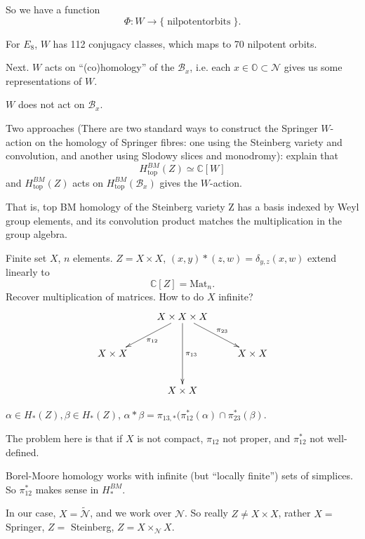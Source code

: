 \noindent
So we have a function
$$
\Phi:W \to \{\operatorname{nilpotent
orbits}\}.
$$
\begin{example}
\label{example-e8-nilpotent-orbits}
For $E_8$, $W$ has 112 conjugacy classes,
which maps to 70 nilpotent orbits.
\end{example}

\medskip\noindent
Next. $W$ acts on ``(co)homology''
of the $\mathcal{B}_x$, i.e.
each $x \in \mathbb{O} \subset \mathcal{N}$
gives us some representations of $W$.

\begin{remark}
\label{remark-w-not-act-springer-fibre}
$W$ does not act on $\mathcal{B}_x$.
\end{remark}

\noindent
Two approaches
(There are two standard ways to construct the
Springer $W$-action on the homology of
Springer fibres: one using the Steinberg
variety and convolution, and another using
Slodowy slices and monodromy):
\cite{ChrissGinzburg} explain
that
$$
H^{BM}_{\operatorname{top}}(Z)
\simeq \mathbb{C}[W]
$$
and $H^{BM}_{\operatorname{top}}
(Z)$ acts on $H^{BM}_{\operatorname{top}}
(\mathcal{B}_x)$
gives the $W$-action.

That is,
top BM homology of the Steinberg variety Z
has a basis indexed by Weyl group elements,
and its convolution product matches the
multiplication in the group algebra.

\noindent
Finite set $X$, $n$ elements.
$Z = X \times X$,
$(x,y) *(z,w)
= \delta_{y,z}(x,w)$
extend linearly to
$$
\mathbb{C}[Z]
= \text{Mat}_{n}.
$$
Recover multiplication of matrices.
How to do $X$ infinite?
$$
\xymatrix{
&  X\times X\times X
\ar[dl]^{\pi_{12}}\ar[dr]^{\pi_{23}}
\ar[dd]^{\pi_{13}}\\
X\times X& & X\times X\\
& X \times X
}
$$

\begin{definition}[Informal]
\label{definition-informal}
$\alpha \in H_*(Z), \beta \in H_*(Z)$,
$\alpha * \beta
= \pi_{13,*}(\pi_{12}^* (\alpha)
\cap \pi_{23}^*(\beta)$.
\end{definition}

\noindent
The problem here is that if $X$ is not
compact, $\pi_{12}$ not proper,
and $\pi_{12}^*$ not well-defined.

Borel-Moore homology works
with infinite (but ``locally finite'')
sets of simplices.
So $\pi^*_{12}$ makes sense in $H_*^{BM}$.

In our case,
$X = \widetilde{\mathcal{N}}$,
and we work over $\mathcal{N}$.
So really $Z \neq X \times X$,
rather $X = $ Springer,
$Z = $ Steinberg,
$Z = X \times_{\mathcal{N}}X$.

